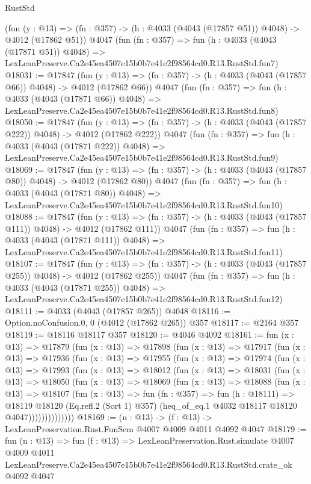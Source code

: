 \begin{lexlean}{RustStd}
\begin{coremodule}
    (fun (y : @13) => (fn : @357) -> (h : @4033 (@4043 (@17857 @51)) @4048) -> @4012 (@17862 @51))
    @4047
    (fun (fn : @357) =>
    fun (h : @4033 (@4043 (@17871 @51)) @4048) =>
    LexLeanPreserve.Ca2e45ea4507e15b0b7e41e2f98564cd0.R13.RustStd.fun7)
@18031 := @17847
    (fun (y : @13) => (fn : @357) -> (h : @4033 (@4043 (@17857 @66)) @4048) -> @4012 (@17862 @66))
    @4047
    (fun (fn : @357) =>
    fun (h : @4033 (@4043 (@17871 @66)) @4048) =>
    LexLeanPreserve.Ca2e45ea4507e15b0b7e41e2f98564cd0.R13.RustStd.fun8)
@18050 := @17847
    (fun (y : @13) => (fn : @357) -> (h : @4033 (@4043 (@17857 @222)) @4048) -> @4012 (@17862 @222))
    @4047
    (fun (fn : @357) =>
    fun (h : @4033 (@4043 (@17871 @222)) @4048) =>
    LexLeanPreserve.Ca2e45ea4507e15b0b7e41e2f98564cd0.R13.RustStd.fun9)
@18069 := @17847
    (fun (y : @13) => (fn : @357) -> (h : @4033 (@4043 (@17857 @80)) @4048) -> @4012 (@17862 @80))
    @4047
    (fun (fn : @357) =>
    fun (h : @4033 (@4043 (@17871 @80)) @4048) =>
    LexLeanPreserve.Ca2e45ea4507e15b0b7e41e2f98564cd0.R13.RustStd.fun10)
@18088 := @17847
    (fun (y : @13) => (fn : @357) -> (h : @4033 (@4043 (@17857 @111)) @4048) -> @4012 (@17862 @111))
    @4047
    (fun (fn : @357) =>
    fun (h : @4033 (@4043 (@17871 @111)) @4048) =>
    LexLeanPreserve.Ca2e45ea4507e15b0b7e41e2f98564cd0.R13.RustStd.fun11)
@18107 := @17847
    (fun (y : @13) => (fn : @357) -> (h : @4033 (@4043 (@17857 @255)) @4048) -> @4012 (@17862 @255))
    @4047
    (fun (fn : @357) =>
    fun (h : @4033 (@4043 (@17871 @255)) @4048) =>
    LexLeanPreserve.Ca2e45ea4507e15b0b7e41e2f98564cd0.R13.RustStd.fun12)
@18111 := @4033 (@4043 (@17857 @265)) @4048
@18116 := Option.noConfusion.{0, 0} (@4012 (@17862 @265)) @357
@18117 := @2164 @357
@18119 := @18116 @18117 @357
@18120 := @4046 @4092
@18161 := fun (x : @13) =>
  @17879
    (fun (x : @13) =>
    @17898
      (fun (x : @13) =>
      @17917
        (fun (x : @13) =>
        @17936
          (fun (x : @13) =>
          @17955
            (fun (x : @13) =>
            @17974
              (fun (x : @13) =>
              @17993
                (fun (x : @13) =>
                @18012
                  (fun (x : @13) =>
                  @18031
                    (fun (x : @13) =>
                    @18050
                      (fun (x : @13) =>
                      @18069
                        (fun (x : @13) =>
                        @18088
                          (fun (x : @13) =>
                          @18107
                            (fun (x : @13) =>
                            fun (fn : @357) =>
                            fun (h : @18111) =>
                            @18119
                              @18120
                              (Eq.refl.{2} (Sort 1) @357)
                              (heq_of_eq.{1} @4032 @18117 @18120 @4047))))))))))))))
@18169 := (n : @13) -> (f : @13) -> LexLeanPreservation.Rust.FunSem @4007 @4009 @4011 @4092 @4047
@18179 := fun (n : @13) =>
  fun (f : @13) =>
  LexLeanPreservation.Rust.simulate
    @4007
    @4009
    @4011
    LexLeanPreserve.Ca2e45ea4507e15b0b7e41e2f98564cd0.R13.RustStd.crate_ok
    @4092
    @4047
\end{coremodule}
\end{lexlean}
